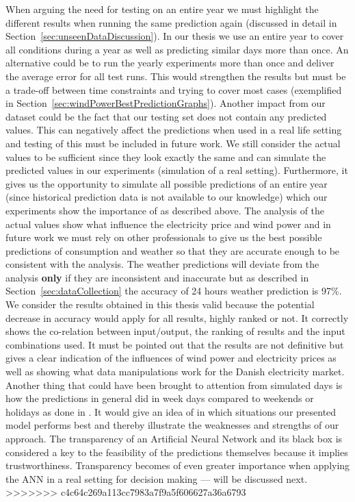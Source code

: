 When arguing the need for testing on an entire year we must highlight the different results when running the same prediction again (discussed in detail in Section~\ref{sec:unseenDataDiscussion}). In our thesis we use an entire year to cover all conditions during a year as well as predicting similar days more than once. An alternative could be to run the yearly experiments more than once and deliver the average error for all test runs. This would strengthen the results but must be a trade-off between time constraints and trying to cover most cases (exemplified in Section~\ref{sec:windPowerBestPredictionGraphs}). Another impact from our dataset could be the fact that our testing set does not contain any predicted values. This can negatively affect the predictions when used in a real life setting and testing of this must be included in future work. We still consider the actual values to be sufficient since they look exactly the same and can simulate the predicted values in our experiments (simulation of a real setting). Furthermore, it gives us the opportunity to simulate all possible predictions of an entire year (since historical prediction data is not available to our knowledge) which our experiments show the importance of as described above. The analysis of the actual values show what influence the electricity price and wind power and in future work we must rely on other professionals to give us the best possible predictions of consumption and weather so that they are accurate enough to be consistent with the analysis. The weather predictions will deviate from the analysis \textbf{only} if they are inconsistent and inaccurate but as described in Section~\ref{sec:dataCollection} the accuracy of 24 hours weather prediction is 97\%. We consider the results obtained in this thesis valid because the potential decrease in accuracy would apply for all results, highly ranked or not. It correctly shows the co-relation between input/output, the ranking of results and the input combinations used. It must be pointed out that the results are not definitive but gives a clear indication of the influences of wind power and electricity prices as well as showing what data manipulations work for the Danish electricity market. Another thing that could have been brought to attention from simulated days is how the predictions in general did in week days compared to weekends or holidays as done in \cite{forecastingSpotPricesAccountingForWindPower}. It would give an idea of in which situations our presented model performs best and thereby illustrate the weaknesses and strengths of our approach. The transparency of an Artificial Neural Network and its black box is considered a key to the feasibility of the predictions themselves because it implies trustworthiness. Transparency becomes of even greater importance when applying the ANN in a real setting for decision making --- will be discussed next.
>>>>>>> c4c64c269a113cc7983a7f9a5f606627a36a6793

